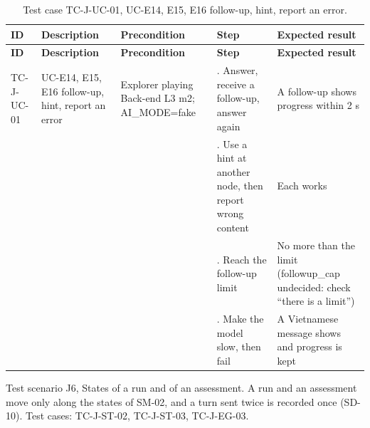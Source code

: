 {\small
\begin{longtable}{|>{\raggedright\arraybackslash}p{}|>{\raggedright\arraybackslash}p{}|>{\raggedright\arraybackslash}p{}|>{\raggedright\arraybackslash}p{}|>{\raggedright\arraybackslash}p{}|}
\caption{Test case TC-J-UC-01, UC-E14, E15, E16 follow-up, hint, report an error.} \\
\hline
\textbf{ID} & \textbf{Description} & \textbf{Precondition} & \textbf{Step} & \textbf{Expected result} \\ \hline
\endfirsthead
\hline
\textbf{ID} & \textbf{Description} & \textbf{Precondition} & \textbf{Step} & \textbf{Expected result} \\ \hline
\endhead
TC-J-UC-01 & UC-E14, E15, E16 follow-up, hint, report an error & Explorer playing Back-end L3 m2; AI\_MODE=fake & 1. Answer, receive a follow-up, answer again & A follow-up shows progress within 2 s \\ \hline
 &  &  & 2. Use a hint at another node, then report wrong content & Each works \\ \hline
 &  &  & 3. Reach the follow-up limit & No more than the limit (followup\_cap undecided: check ``there is a limit'') \\ \hline
 &  &  & 4. Make the model slow, then fail & A Vietnamese message shows and progress is kept \\ \hline
\end{longtable}
}

Test scenario J6, States of a run and of an assessment. A run and an assessment move only along the states of SM-02, and a turn sent twice is recorded once (SD-10). Test cases: TC-J-ST-02, TC-J-ST-03, TC-J-EG-03.

